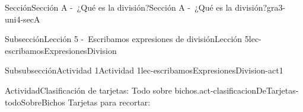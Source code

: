 \raggedbottom
\label{gra3-uni4}\hypertarget{gra3-uni4}{}
\maketitle
\thispagestyle{empty}
\cleardoublepage
%
%
\typeout{************************************************}
\typeout{************************************************}
%
\begin{sectionptx}{Sección}{Sección A -~¿Qué es la división?}{}{Sección A -~¿Qué es la división?}{}{}{gra3-uni4-secA}
%
%

\typeout{************************************************}
\typeout{************************************************}
%
\begin{subsectionptx}{Subsección}{Lección 5 -~Escribamos expresiones de división}{}{Lección 5}{}{}{lec-escribamosExpresionesDivision}
%
%
\typeout{************************************************}
\typeout{************************************************}
%
\begin{cutoutpage}
\begin{subsubsectionptx}{Subsubsección}{Actividad 1}{}{Actividad 1}{}{}{lec-escribamosExpresionesDivision-act1}
\begin{activity}{Actividad}{Clasificación de tarjetas: Todo sobre bichos.}{act-clasificacionDeTarjetas-todoSobreBichos}%
Tarjetas para recortar:%
\end{activity}%

\end{subsubsectionptx}
\end{cutoutpage}
\end{subsectionptx}
\end{sectionptx}
